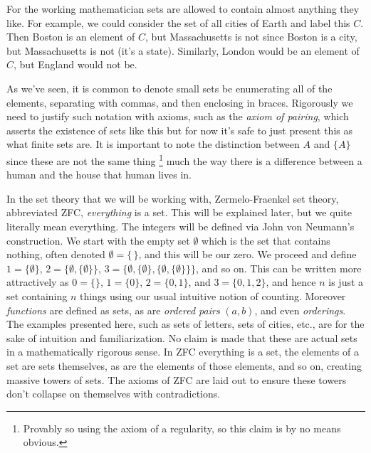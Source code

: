         \begin{example}
            For the working mathematician sets are allowed to contain almost
            anything they like. For example, we could consider the set of all
            cities of Earth and label this $C$. Then Boston is an element of
            $C$, but Massachusetts is not since Boston is a city, but
            Massachusetts is not (it's a state). Similarly, London would be an
            element of $C$, but England would not be.
        \end{example}
        As we've seen, it is common to denote small sets be enumerating all of
        the elements, separating with commas, and then enclosing in braces.
        Rigorously we need to justify such notation with axioms, such as the
        \textit{axiom of pairing}, which asserts the existence of sets like this
        but for now it's safe to just present this as what finite sets are. It
        is important to note the distinction between $A$ and $\{A\}$ since these
        are not the same thing%
        \footnote{%
            Provably so using the axiom of a regularity, so this claim is by no
            means obvious.
        }
        much the way there is a difference between a human and the house that
        human lives in.
        \begin{example}
            \label{ex:Everything_is_a_Set}%
            In the set theory that we will be working with, Zermelo-Fraenkel set
            theory, abbreviated
            \gls{ZFC}, \textit{everything} is a set. This will be explained
            later, but we quite literally mean everything. The integers will be
            defined via John von Neumann's
            construction. We start with the empty set
            $\emptyset$ which is the set that contains nothing, often denoted
            $\emptyset=\{\,\}$, and this will be our zero. We proceed and define
            $1=\{\emptyset\}$, $2=\{\emptyset,\{\emptyset\}\}$,
            $3=\{\emptyset,\{\emptyset\},\{\emptyset,\{\emptyset\}\}\}$, and so
            on. This can be written more attractively as $0=\{\}$, $1=\{0\}$,
            $2=\{0,1\}$, and $3=\{0,1,2\}$, and hence $n$ is just a set
            containing $n$ things using our usual intuitive notion of counting.
            Moreover \textit{functions} are defined as sets, as are
            \textit{ordered pairs} $(a,b)$, and even \textit{orderings}. The
            examples presented here, such as sets of letters, sets of cities,
            etc., are for the sake of intuition and familiarization. No claim is
            made that these are actual sets in a mathematically rigorous sense.
            In ZFC everything is a set, the elements of a set are sets
            themselves, as are the elements of those elements, and so on,
            creating massive towers of sets. The axioms of ZFC are laid out to
            ensure these towers don't collapse on themselves with
            contradictions.
        \end{example}
